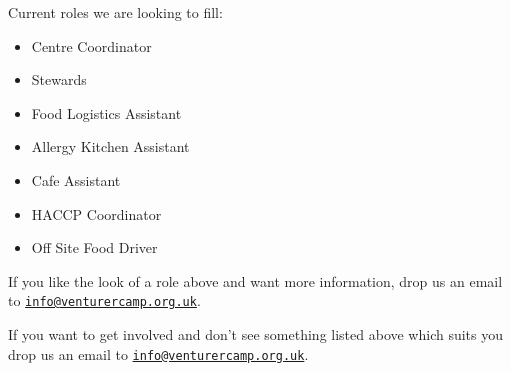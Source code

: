 \documentclass[a4paper, 11pt]{report}
\makeatletter
\newcommand{\nl}{\newline}
\newcommand{\infoemail}{\href{mailto:info@venturercamp.org.uk}{\texttt{info@venturercamp.org.uk}}}
\makeatother
\begin{document}
Current roles we are looking to fill:
\begin{itemize}
    \item Centre Coordinator
    \item Stewards
    \item Food Logistics Assistant
    \item Allergy Kitchen Assistant
    \item Cafe Assistant
    \item HACCP Coordinator
    \item Off Site Food Driver
\end{itemize}
If you like the look of a role above and want more information, drop us an email to \infoemail. \nl

If you want to get involved and don't see something listed above which suits you drop us an email to \infoemail. 

\backPage
\end{document}
